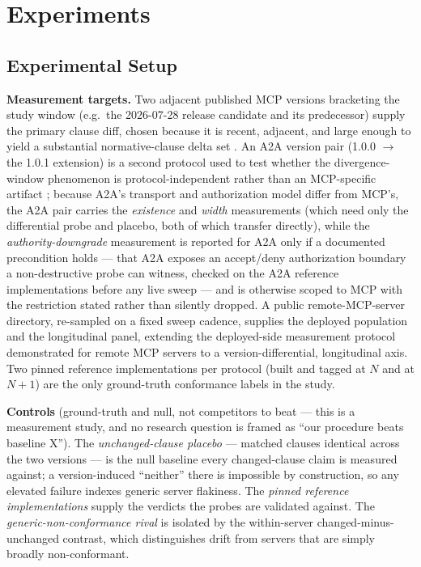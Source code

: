 \documentclass[11pt]{article}
\begin{document}
\section{Experiments}

\subsection{Experimental Setup}

\textbf{Measurement targets.} Two adjacent published MCP versions bracketing the study window (e.g.\ the 2026-07-28 release candidate and its predecessor) supply the primary clause diff, chosen because it is recent, adjacent, and large enough to yield a substantial normative-clause delta set \citep{mcp2024}. An A2A version pair (1.0.0 $\to$ the 1.0.1 extension) is a second protocol used to test whether the divergence-window phenomenon is protocol-independent rather than an MCP-specific artifact \citep{a2a2025}; because A2A's transport and authorization model differ from MCP's, the A2A pair carries the \emph{existence} and \emph{width} measurements (which need only the differential probe and placebo, both of which transfer directly), while the \emph{authority-downgrade} measurement is reported for A2A only if a documented precondition holds --- that A2A exposes an accept/deny authorization boundary a non-destructive probe can witness, checked on the A2A reference implementations before any live sweep --- and is otherwise scoped to MCP with the restriction stated rather than silently dropped. A public remote-MCP-server directory, re-sampled on a fixed sweep cadence, supplies the deployed population and the longitudinal panel, extending the deployed-side measurement protocol demonstrated for remote MCP servers \citep{remotemcp} to a version-differential, longitudinal axis. Two pinned reference implementations per protocol (built and tagged at $N$ and at $N{+}1$) are the only ground-truth conformance labels in the study.

\textbf{Controls} (ground-truth and null, not competitors to beat --- this is a measurement study, and no research question is framed as ``our procedure beats baseline X''). The \emph{unchanged-clause placebo} --- matched clauses identical across the two versions --- is the null baseline every changed-clause claim is measured against; a version-induced ``neither'' there is impossible by construction, so any elevated failure indexes generic server flakiness. The \emph{pinned reference implementations} supply the verdicts the probes are validated against. The \emph{generic-non-conformance rival} is isolated by the within-server changed-minus-unchanged contrast, which distinguishes drift from servers that are simply broadly non-conformant.
\end{document}
